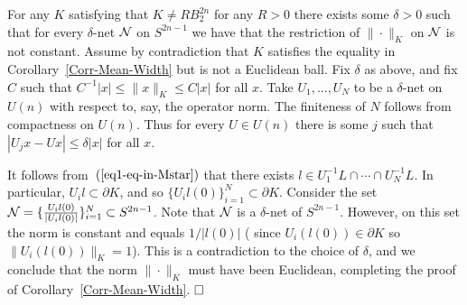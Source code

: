 \documentclass[12pt]{article}
\def\R{{\mathbb R}}
\def\sph{S^{2n-1}}
\begin{document}
For any $K$ satisfying that $K \neq RB_2^{2n}$ for any $R>0$  there
exists some $\delta>0$ such that for every $\delta$-net ${\cal N}$
on $\sph$ we have that  the restriction of $\| \cdot \|_K$ on ${\cal
N}$ is not constant.  %
Assume by contradiction that $K$ satisfies the equality in
Corollary~\ref{Corr-Mean-Width} but is not a Euclidean ball. Fix
$\delta$ as above, %
and fix $C$ such that $C^{-1}|x| \le \|x\|_K \le C|x|$ for all $x$.
Take $U_1 , \ldots, U_N$ to be a $\delta$-net on $U(n)$ with respect
to, say, the operator norm. The finiteness of $N$ follows from
compactness on $U(n)$. Thus for every $U \in U(n)$ there is some $j$
such that $|U_jx - Ux|\le \delta |x|$ for all $x$.

It follows from~$(\ref{eq1-eq-in-Mstar})$ that there exists $l \in
U_1^{-1} L \cap \cdots \cap U_N^{-1}L$. In particular, $U_i l
\subset
\partial K$, and so $\{U_i l (0)\}_{i=1}^N \subset \partial K$.
Consider the set ${\cal N} = \{\frac{U_i l (0)}{|U_i l
(0)|}\}_{i=1}^N \subset \sph$. Note that ${\cal N}$ is a
$\delta$-net of $\sph$.
However, on this set the norm is constant and equals $1/|l(0)|$ (
since $U_i (l(0)) \in \partial K$ so $\| U_i(l(0)) \|_K = 1$).
This is a contradiction to the choice of $\delta$, and we conclude
that the norm $\|\cdot\|_K$ must have been Euclidean, completing the
proof of Corollary~\ref{Corr-Mean-Width}. $\hfill \square$


\vskip 12pt
\end{document}

